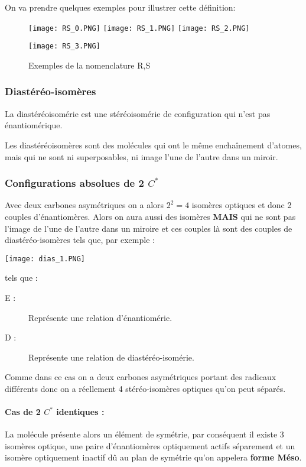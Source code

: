 \documentclass[a4paper, oneside]{book}
\begin{document}
On va prendre quelques exemples pour illustrer cette définition:
\begin{figure}[!h]
    \centering
    \texttt{[image: RS\_0.PNG]}
    \texttt{[image: RS\_1.PNG]}
    \texttt{[image: RS\_2.PNG]}
\end{figure}
\begin{figure}[!h]
    \centering
    \texttt{[image: RS\_3.PNG]}
    \caption{Exemples de la nomenclature R,S}
    \label{fig:my_label}
\end{figure}
\newpage
\subsubsection{Diastéréo-isomères}
La diastéréoisomérie est une stéréoisomérie de configuration qui n'est pas énantiomérique.

Les diastéréoisomères sont des molécules qui ont le même enchaînement d'atomes, mais qui ne sont ni superposables, ni image l'une de l'autre dans un miroir.
\subsubsection{Configurations absolues de 2 $C^*$}
Avec deux carbones asymétriques on a alors $2^2=4$ isomères optiques et donc 2 couples d'énantiomères. Alors on aura aussi des isomères \textbf{MAIS} qui ne sont pas l'image de l'une de l'autre dans un miroire et ces couples là sont des couples de diastéréo-isomères tels que, par exemple :
\begin{center}
    \texttt{[image: dias\_1.PNG]}
\end{center}
tels que :
\begin{description}
    \item[E :] Représente une relation d'énantiomérie.
    \item[D :] Représente une relation de diastéréo-isomérie.
\end{description}
Comme dans ce cas on a deux carbones asymétriques portant des radicaux différents donc on a réellement 4 stéréo-isomères optiques qu'on peut séparés.
\paragraph{Cas de 2 $C^*$ identiques : }
La molécule présente alors un élément de symétrie, par conséquent il existe 3 isomères optique, une paire d'énantiomères optiquement actifs séparement et un isomère optiquement inactif dû au plan de symétrie qu'on appelera \textbf{forme Méso}. 
\end{document}
